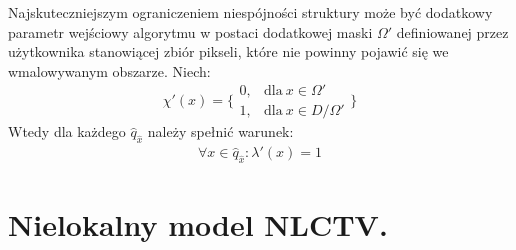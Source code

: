 \documentclass[a4paper,12pt,twoside,openany]{report}
\begin{document}
Najskuteczniejszym ograniczeniem niespójności struktury może być dodatkowy parametr wejściowy algorytmu w postaci dodatkowej maski $\Omega '$ definiowanej przez użytkownika stanowiącej zbiór pikseli, które nie powinny pojawić się we wmalowywanym obszarze. Niech:
\begin{equation}
\chi' \left(x\right)=\Bigg\{ \begin{array}{ll}
0, & \text{dla} \ x \in \Omega' \\ 
1, & \text{dla} \ x \in D/ \Omega' \end{array}
\Bigg\}
\end{equation}
Wtedy dla każdego $\hat{q}_{\hat{x}}$ należy spełnić warunek:
\begin{align}
\forall x \in \hat{q}_{\hat{x}} : {\lambda }'(x) = 1
\end{align}
\section{Nielokalny model NLCTV.}
\end{document}
